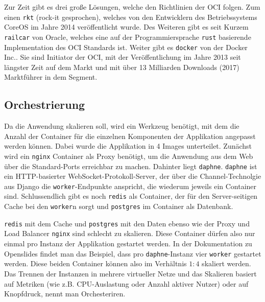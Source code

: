 \documentclass[11pt,a4paper]{article}
\begin{document}
Zur Zeit gibt es drei große Lösungen, welche den Richtlinien der \ac{OCI} 
folgen. Zum einen \texttt{rkt} (rock-it gesprochen), welches von den 
Entwicklern des Betriebssystems \grqq{}CoreOS\glqq{} im Jahre 2014 
veröffentlicht wurde\cite{rkthp}. Des Weiteren gibt es seit Kurzem 
\texttt{railcar} von \grqq{}Oracle\glqq{}, welches eine auf der 
Programmiersprache \texttt{rust} basierende Implementation des \ac{OCI} 
Standards ist\cite{railcarhp}. Weiter gibt es \texttt{docker} von der 
\glqq{}Docker Inc.\grqq{}. Sie sind Initiator der \ac{OCI}, mit der 
Veröffentlichung im Jahre 2013 seit längster Zeit auf dem Markt und mit über 13 
Milliarden Downloads (2017) Marktführer in dem Segment\cite{dockerdl}.
\subsection{Orchestrierung} \label{subsec:sdtorch}
Da die Anwendung skalieren soll, wird ein Werkzeug benötigt, mit dem die Anzahl 
der Container für die einzelnen Komponenten der Applikation angepasst werden 
können. Dabei wurde die Applikation in 4 Images unterteilet. Zunächst wird ein 
\texttt{nginx}\cite{nginx} Container als \glqq{}Proxy\grqq{} benötigt, um die 
Anwendung aus dem Web über die Standard-Ports erreichbar zu machen. Dahinter 
liegt \texttt{daphne}\cite{daphne}. \texttt{daphne} ist ein HTTP-basierter 
WebSocket-Protokoll-Server, der über die Channel-Technolgie aus Django die 
\texttt{worker}-Endpunkte anspricht, die wiederum jeweils ein Container sind. 
Schlussendlich gibt es noch \texttt{redis}\cite{redis} als Container, der für 
den Server-seitigen Cache bei den \texttt{worker}n sorgt und 
\texttt{postgres}\cite{postgres} im Container als Datenbank.

\texttt{redis} mit dem Cache und \texttt{postgres} mit den Daten ebenso wie der 
Proxy und Load Balancer \texttt{nginx} sind schlecht zu skalieren. Diese 
Container dürfen also nur einmal pro Instanz der Applikation gestartet werden. 
In der Dokumentation zu Openslides\cite{osgh} findet man das Beispiel, dass pro 
\texttt{daphne}-Instanz vier \texttt{worker} gestartet werden. Diese 
beiden Container können also im Verhältnis $1:4$ skaliert werden. Das Trennen 
der Instanzen in mehrere virtueller Netze und das Skalieren basiert auf 
Metriken (wie z.B. CPU-Auslastung oder Anzahl aktiver Nutzer) oder auf 
\glqq{}Knopfdruck\grqq{}, nennt man Orchesteriren.
\end{document}
